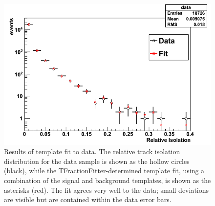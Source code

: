  \begin{figure}[htb]
  \begin{center}
    \includegraphics[width=360pt]{Figures/TFractionFitter-full-01Mar11.png}
  \end{center}
  \caption[\fixspacing Results of template fit to data]{
    \fixspacing Results of template fit to data.
    The relative track isolation distribution 
    for the data sample 
    is shown as the hollow circles (black), 
    while the TFractionFitter-determined 
    template fit, 
    using a combination of the signal 
    and background templates, 
    is shown as the asterisks (red).  
    The fit agrees very well to the data; 
    small deviations are visible but 
    are contained within the data error bars.  
  }
  \label{fig:TFractionFit}
 \end{figure}

